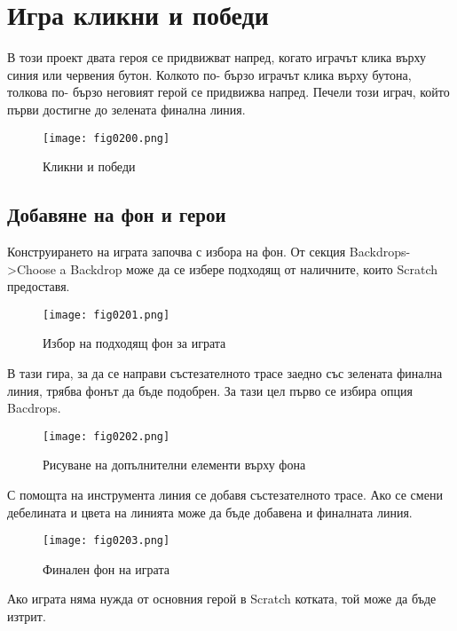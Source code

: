\chapter{Игра кликни и победи}

В този проект двата героя се придвижват напред, когато играчът клика върху синия или червения бутон. Колкото по- бързо играчът клика върху бутона, толкова по- бързо неговият герой се придвижва напред. Печели този играч, който първи достигне до зелената финална линия.

\begin{figure}[H]
  \centering
  \texttt{[image: fig0200.png]}
  \caption{Кликни и победи}
\label{fig0200}
\end{figure}

\section{Добавяне на фон и герои}
Конструирането на играта започва с избора на фон. От секция Backdrops->Choose a Backdrop може да се избере подходящ от наличните, които Scratch предоставя.

\begin{figure}[H]
  \centering
  \texttt{[image: fig0201.png]}
  \caption{Избор на подходящ фон за играта}
\label{fig0201}
\end{figure}

В тази гира, за да се направи състезателното трасе заедно със зелената финална линия, трябва фонът да бъде подобрен. За тази цел първо се избира опция Bacdrops.

\begin{figure}[H]
  \centering
  \texttt{[image: fig0202.png]}
  \caption{Рисуване на допълнителни елементи върху фона}
\label{fig0202}
\end{figure}

С помощта на инструмента линия се добавя състезателното трасе. Ако се смени дебелината и цвета на линията може да бъде добавена и финалната линия.

\begin{figure}[H]
  \centering
  \texttt{[image: fig0203.png]}
  \caption{Финален фон на играта}
\label{fig0203}
\end{figure}

Ако играта няма нужда от основния герой в Scratch котката, той може да бъде изтрит.

